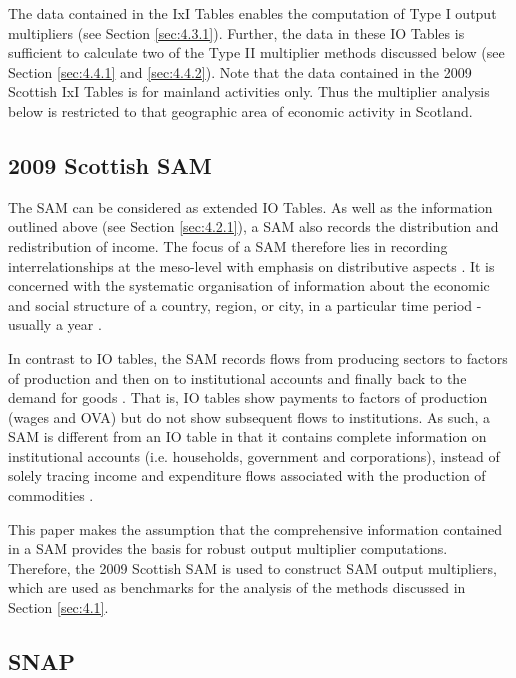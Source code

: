 \begin{doublespacing}
\bigskip

The data contained in the IxI Tables enables the computation of Type I output multipliers (see Section \ref{sec:4.3.1}). Further, the data in these IO Tables is sufficient to calculate two of the Type II multiplier methods discussed below (see Section \ref{sec:4.4.1} and \ref{sec:4.4.2}). Note that the data contained in the 2009 Scottish IxI Tables is for mainland activities only. Thus the multiplier analysis below is restricted to that geographic area of economic activity in Scotland.

\subsection{2009 Scottish SAM}
\label{sec:4.2.2}

The SAM can be considered as extended IO Tables. As well as the information outlined above (see Section \ref{sec:4.2.1}), a SAM also records the distribution and redistribution of income. The focus of a SAM therefore lies in recording interrelationships at the meso-level with emphasis on distributive aspects \cite{Keuning1988a}. It is concerned with the systematic organisation of information about the economic and social structure of a country, region, or city, in a particular time period - usually a year \cite{King1981a}.  

\bigskip

In contrast to IO tables, the SAM records flows from producing sectors to factors of production and then on to institutional accounts and finally back to the demand for goods \cite{Adelman1986a}. That is, IO tables show payments to factors of production (wages and OVA) but do not show subsequent flows to institutions. As such, a SAM is different from an IO table in that it contains complete information on institutional accounts (i.e. households, government and corporations), instead of solely tracing income and expenditure flows associated with the production of commodities .

\bigskip

This paper makes the assumption that the comprehensive information contained in a SAM provides the basis for robust output multiplier computations. Therefore, the 2009 Scottish SAM is used to construct SAM output multipliers, which are used as benchmarks for the analysis of the methods discussed in Section \ref{sec:4.1}.

\subsection{SNAP}
\label{sec:4.2.3}


\end{doublespacing}

